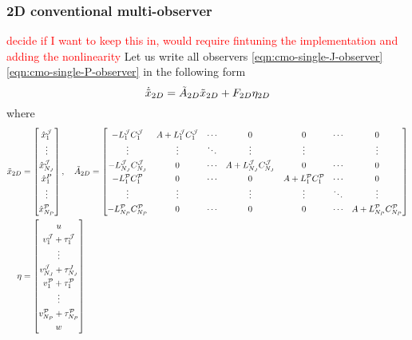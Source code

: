 \subsubsection{2D conventional multi-observer}
\textcolor{red}{decide if I want to keep this in, would require fintuning the implementation and adding the nonlinearity}
Let us write all observers \eqref{eqn:cmo-single-J-observer}\eqref{eqn:cmo-single-P-observer} in the following form
\begin{equation*}
    \dot{\Tilde{x}}_{2D} = \Tilde{A}_{2D}\Tilde{x}_{2D} + F_{2D}\eta_{2D}
\end{equation*}
where
\begin{equation}\label{eqn:2D-CMO}
\renewcommand{\arraystretch}{1.3}
    \begin{split}    
        \Tilde{x}_{2D} &= 
        \begin{bmatrix}
            \hat{x}_1^{\mcJ} \\ \vdots \\ \hat{x}_{N_J}^{\mcJ} \\ \hat{x}_1^{P} \\ \vdots \\ \hat{x}_{N_P}^{\mcP}
        \end{bmatrix}, \quad
        \Tilde{A}_{2D} = 
        \begin{bmatrix}
            -L_1^{\mcJ}C_1^{\mcJ} & A + L_1^{\mcJ}C_1^{\mcJ} & \cdots & 0  & 0 & \cdots & 0 \\
            \vdots & \vdots & \ddots & \vdots & \vdots & & \vdots \\
            -L_{N_J}^{\mcJ}C_{N_J}^{\mcJ} & 0 & \cdots & A + L_{N_J}^{\mcJ}C_{N_J}^{\mcJ} & 0 & \cdots & 0 \\
            -L_{1}^{\mcP}C_{1}^{\mcP} & 0 & \cdots & 0 & A + L_1^{\mcP}C_1^{\mcP} & \cdots & 0 \\
            \vdots & \vdots &  & \vdots & \vdots & \ddots & \vdots \\
            -L_{N_P}^{\mcP}C_{N_P}^{\mcP} & 0 & \cdots & 0 & 0 & \cdots & A + L_{N_P}^{\mcP}C_{N_P}^{\mcP} \\
        \end{bmatrix} \\
        \eta &= 
        \begin{bmatrix}
            u \\ v_1^{\mcJ} + \tau_1^{\mcJ} \\ \vdots \\ v_{N_J}^{\mcJ} + \tau_{N_J}^J \\ v_1^{\mcP} + \tau_1^{\mcP} \\ \vdots \\ v_{N_P}^{\mcP} + \tau_{N_P}^{\mcP} \\ w \\

\end{bmatrix}
\end{split}
\end{equation}
